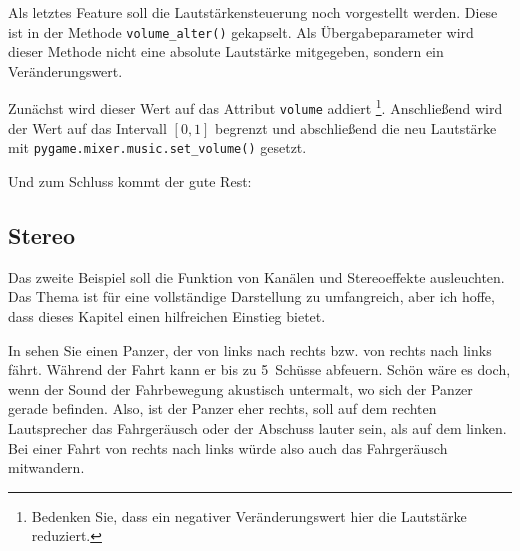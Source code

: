 
Als letztes Feature soll die Lautstärkensteuerung noch vorgestellt werden. Diese ist in der Methode \texttt{volume\_alter()} gekapselt. Als Übergabeparameter wird dieser Methode nicht eine absolute Lautstärke mitgegeben, sondern ein Veränderungswert. 

Zunächst wird dieser Wert auf das Attribut \texttt{volume} addiert \footnote{Bedenken Sie, dass ein negativer Veränderungswert hier die Lautstärke reduziert.}. Anschließend wird der Wert auf das Intervall $[0, 1]$ begrenzt und abschließend die neu Lautstärke mit \texttt{pygame.mixer\-.music\-.set\-\_volume()} gesetzt.


Und zum Schluss kommt der gute Rest:


\subsection{Stereo}

Das zweite Beispiel soll die Funktion von Kanälen und \Acrshort{Stereo}effekte ausleuchten. Das Thema ist für eine vollständige Darstellung zu umfangreich, aber ich hoffe, dass dieses Kapitel einen hilfreichen Einstieg bietet.

In  sehen Sie einen Panzer, der von links nach rechts bzw. von rechts nach links fährt.  Während der Fahrt kann er bis zu 5~Schüsse abfeuern. Schön wäre es doch, wenn der Sound der Fahrbewegung akustisch untermalt, wo sich der Panzer gerade befinden. Also, ist der Panzer eher rechts, soll auf dem rechten Lautsprecher das Fahrgeräusch oder der Abschuss lauter sein, als auf dem linken. Bei einer Fahrt von rechts nach links würde also auch das Fahrgeräusch mitwandern.



\newpage 

